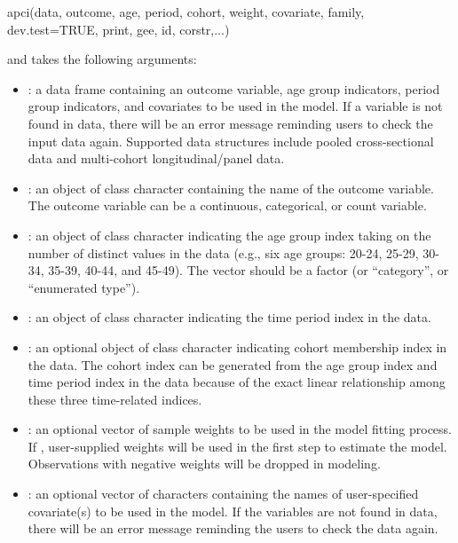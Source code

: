 \begin{example}
	apci(data, outcome, age, period, cohort, weight, covariate, family, 
		dev.test=TRUE, print, gee, id, corstr,...)
\end{example}

and takes the following arguments:

\begin{itemize}
\item {}: a data frame containing an outcome variable, age group indicators, period group indicators, and covariates to be used in the model. If a variable is not found in data, there will be an error message reminding users to check the input data again. Supported data structures include pooled cross-sectional data and multi-cohort longitudinal/panel data. 

\item {}: an object of class character containing the name of the outcome variable. The outcome variable can be a continuous, categorical, or count variable. 

\item {}: an object of class character indicating the age group index taking on the number of distinct values in the data (e.g., six age groups: 20-24, 25-29, 30-34, 35-39, 40-44, and 45-49). The vector should be a factor (or ``category'', or ``enumerated type'').

\item {}: an object of class character indicating the time period index in the data.

\item {}: an optional object of class character indicating cohort membership index in the data. The cohort index can be generated from the age group index and time period index in the data because of the exact linear relationship among these three time-related indices.

\item {}: an optional vector of sample weights to be used in the model fitting process. If {}, user-supplied weights will be used in the first step to estimate the model. Observations with negative weights will be dropped in modeling.

\item {}: an optional vector of characters containing the names of user-specified covariate(s) to be used in the model. If the variables are not found in data, there will be an error message reminding the users to check the data again.


\end{itemize}
